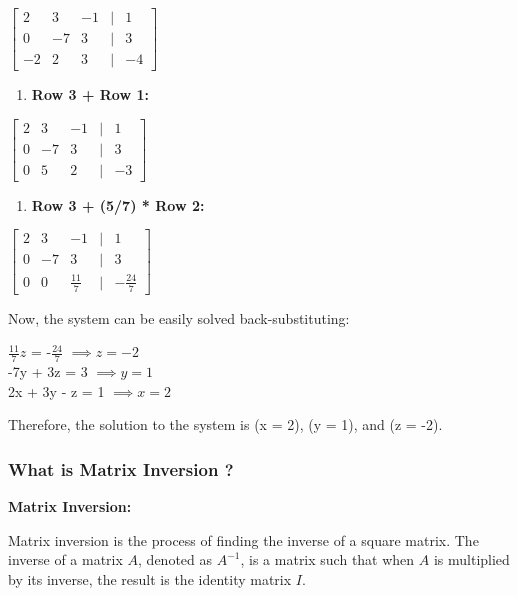 \documentclass[11pt]{article}
\providecommand{\tightlist}{%
      \setlength{\itemsep}{0pt}\setlength{\parskip}{0pt}}
\begin{document}
\(\begin{bmatrix} 2 & 3 & -1 & | & 1 \\ 0 & -7 & 3 & | & 3 \\ -2 & 2 & 3 & | & -4 \end{bmatrix}\)

\begin{enumerate}
\def\labelenumi{\arabic{enumi}.}
\setcounter{enumi}{1}
\tightlist
\item
  \textbf{Row 3 + Row 1:}
\end{enumerate}

\(\begin{bmatrix} 2 & 3 & -1 & | & 1 \\ 0 & -7 & 3 & | & 3 \\ 0 & 5 & 2 & | & -3 \end{bmatrix}\)

\begin{enumerate}
\def\labelenumi{\arabic{enumi}.}
\setcounter{enumi}{2}
\tightlist
\item
  \textbf{Row 3 + (5/7) * Row 2:}
\end{enumerate}

\(\begin{bmatrix} 2 & 3 & -1 & | & 1 \\ 0 & -7 & 3 & | & 3 \\ 0 & 0 & \frac{11}{7} & | & -\frac{24}{7} \end{bmatrix}\)

Now, the system can be easily solved back-substituting:


$\frac{11}{7}z$ = -$\frac{24}{7}$ $\implies z = -2$ \\
-7y + 3z = 3 $\implies y = 1$ \\
2x + 3y - z = 1 $\implies x = 2$


Therefore, the solution to the system is (x = 2), (y = 1), and (z = -2).

    

    \hypertarget{what-is-matrix-inversion}{%
\subsubsection{What is Matrix Inversion
?}\label{what-is-matrix-inversion}}

    \textbf{Matrix Inversion:}

Matrix inversion is the process of finding the inverse of a square
matrix. The inverse of a matrix \(A\), denoted as \(A^{-1}\), is a
matrix such that when \(A\) is multiplied by its inverse, the result is
the identity matrix \(I\).
\end{document}
